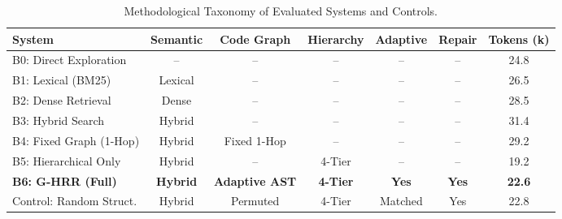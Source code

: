\begin{table}[t]
\centering
\small
\caption{Methodological Taxonomy of Evaluated Systems and Controls.}
\label{tab:methods}
\begin{tabular}{lcccccc}
\toprule
\textbf{System} & \textbf{Semantic} & \textbf{Code Graph} & \textbf{Hierarchy} & \textbf{Adaptive} & \textbf{Repair} & \textbf{Tokens (k)} \\
\midrule
B0: Direct Exploration & -- & -- & -- & -- & -- & 24.8 \\
B1: Lexical (BM25) & Lexical & -- & -- & -- & -- & 26.5 \\
B2: Dense Retrieval & Dense & -- & -- & -- & -- & 28.5 \\
B3: Hybrid Search & Hybrid & -- & -- & -- & -- & 31.4 \\
B4: Fixed Graph (1-Hop) & Hybrid & Fixed 1-Hop & -- & -- & -- & 29.2 \\
B5: Hierarchical Only & Hybrid & -- & 4-Tier & -- & -- & 19.2 \\
\textbf{B6: G-HRR (Full)} & \textbf{Hybrid} & \textbf{Adaptive AST} & \textbf{4-Tier} & \textbf{Yes} & \textbf{Yes} & \textbf{22.6} \\
Control: Random Struct. & Hybrid & Permuted & 4-Tier & Matched & Yes & 22.8 \\
\bottomrule
\end{tabular}
\end{table}